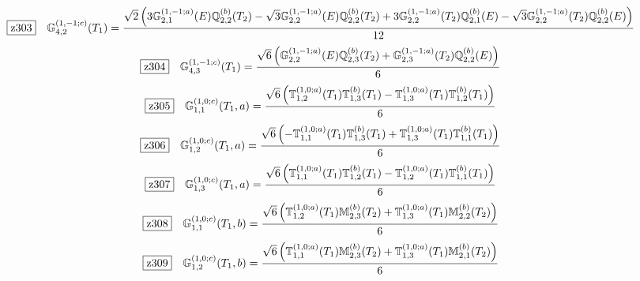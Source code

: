 \documentclass[fleqn,10pt,landscape]{jsarticle}
\begin{document}
\begin{dmath*}
\hspace*{3mm}\fbox{z303}\quad \mathbb{G}_{4,2}^{(1,-1;c)}(T_{1})=\frac{\sqrt{2} \left(3 \mathbb{G}_{2,1}^{(1,-1;a)}(E) \mathbb{Q}_{2,2}^{(b)}(T_{2}) - \sqrt{3} \mathbb{G}_{2,2}^{(1,-1;a)}(E) \mathbb{Q}_{2,2}^{(b)}(T_{2}) + 3 \mathbb{G}_{2,2}^{(1,-1;a)}(T_{2}) \mathbb{Q}_{2,1}^{(b)}(E) - \sqrt{3} \mathbb{G}_{2,2}^{(1,-1;a)}(T_{2}) \mathbb{Q}_{2,2}^{(b)}(E)\right)}{12}
\end{dmath*}
\begin{dmath*}
\hspace*{3mm}\fbox{z304}\quad \mathbb{G}_{4,3}^{(1,-1;c)}(T_{1})=\frac{\sqrt{6} \left(\mathbb{G}_{2,2}^{(1,-1;a)}(E) \mathbb{Q}_{2,3}^{(b)}(T_{2}) + \mathbb{G}_{2,3}^{(1,-1;a)}(T_{2}) \mathbb{Q}_{2,2}^{(b)}(E)\right)}{6}
\end{dmath*}
\begin{dmath*}
\hspace*{3mm}\fbox{z305}\quad \mathbb{G}_{1,1}^{(1,0;c)}(T_{1},a)=\frac{\sqrt{6} \left(\mathbb{T}_{1,2}^{(1,0;a)}(T_{1}) \mathbb{T}_{1,3}^{(b)}(T_{1}) - \mathbb{T}_{1,3}^{(1,0;a)}(T_{1}) \mathbb{T}_{1,2}^{(b)}(T_{1})\right)}{6}
\end{dmath*}
\begin{dmath*}
\hspace*{3mm}\fbox{z306}\quad \mathbb{G}_{1,2}^{(1,0;c)}(T_{1},a)=\frac{\sqrt{6} \left(- \mathbb{T}_{1,1}^{(1,0;a)}(T_{1}) \mathbb{T}_{1,3}^{(b)}(T_{1}) + \mathbb{T}_{1,3}^{(1,0;a)}(T_{1}) \mathbb{T}_{1,1}^{(b)}(T_{1})\right)}{6}
\end{dmath*}
\begin{dmath*}
\hspace*{3mm}\fbox{z307}\quad \mathbb{G}_{1,3}^{(1,0;c)}(T_{1},a)=\frac{\sqrt{6} \left(\mathbb{T}_{1,1}^{(1,0;a)}(T_{1}) \mathbb{T}_{1,2}^{(b)}(T_{1}) - \mathbb{T}_{1,2}^{(1,0;a)}(T_{1}) \mathbb{T}_{1,1}^{(b)}(T_{1})\right)}{6}
\end{dmath*}
\begin{dmath*}
\hspace*{3mm}\fbox{z308}\quad \mathbb{G}_{1,1}^{(1,0;c)}(T_{1},b)=\frac{\sqrt{6} \left(\mathbb{T}_{1,2}^{(1,0;a)}(T_{1}) \mathbb{M}_{2,3}^{(b)}(T_{2}) + \mathbb{T}_{1,3}^{(1,0;a)}(T_{1}) \mathbb{M}_{2,2}^{(b)}(T_{2})\right)}{6}
\end{dmath*}
\begin{dmath*}
\hspace*{3mm}\fbox{z309}\quad \mathbb{G}_{1,2}^{(1,0;c)}(T_{1},b)=\frac{\sqrt{6} \left(\mathbb{T}_{1,1}^{(1,0;a)}(T_{1}) \mathbb{M}_{2,3}^{(b)}(T_{2}) + \mathbb{T}_{1,3}^{(1,0;a)}(T_{1}) \mathbb{M}_{2,1}^{(b)}(T_{2})\right)}{6}
\end{dmath*}
\end{document}
